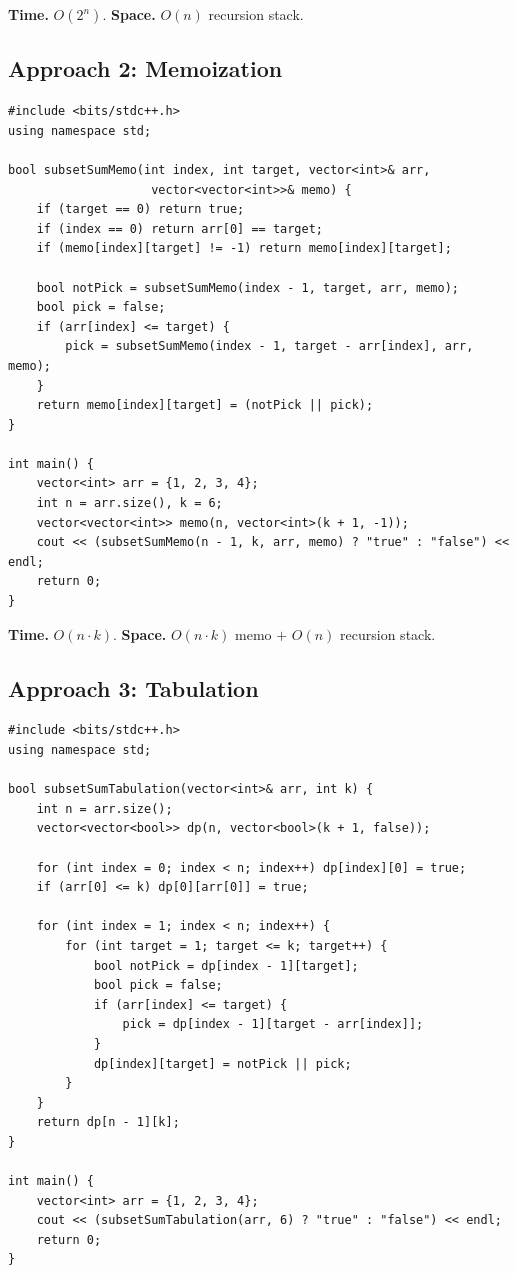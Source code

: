 \begin{complexitybox}
\textbf{Time.} $O(2^n)$.
\textbf{Space.} $O(n)$ recursion stack.
\end{complexitybox}

\subsection*{Approach 2: Memoization}

\begin{lstlisting}
#include <bits/stdc++.h>
using namespace std;

bool subsetSumMemo(int index, int target, vector<int>& arr,
                    vector<vector<int>>& memo) {
    if (target == 0) return true;
    if (index == 0) return arr[0] == target;
    if (memo[index][target] != -1) return memo[index][target];

    bool notPick = subsetSumMemo(index - 1, target, arr, memo);
    bool pick = false;
    if (arr[index] <= target) {
        pick = subsetSumMemo(index - 1, target - arr[index], arr, memo);
    }
    return memo[index][target] = (notPick || pick);
}

int main() {
    vector<int> arr = {1, 2, 3, 4};
    int n = arr.size(), k = 6;
    vector<vector<int>> memo(n, vector<int>(k + 1, -1));
    cout << (subsetSumMemo(n - 1, k, arr, memo) ? "true" : "false") << endl;
    return 0;
}
\end{lstlisting}

\begin{complexitybox}
\textbf{Time.} $O(n \cdot k)$.
\textbf{Space.} $O(n \cdot k)$ memo $+$ $O(n)$ recursion stack.
\end{complexitybox}

\subsection*{Approach 3: Tabulation}

\begin{lstlisting}
#include <bits/stdc++.h>
using namespace std;

bool subsetSumTabulation(vector<int>& arr, int k) {
    int n = arr.size();
    vector<vector<bool>> dp(n, vector<bool>(k + 1, false));

    for (int index = 0; index < n; index++) dp[index][0] = true;
    if (arr[0] <= k) dp[0][arr[0]] = true;

    for (int index = 1; index < n; index++) {
        for (int target = 1; target <= k; target++) {
            bool notPick = dp[index - 1][target];
            bool pick = false;
            if (arr[index] <= target) {
                pick = dp[index - 1][target - arr[index]];
            }
            dp[index][target] = notPick || pick;
        }
    }
    return dp[n - 1][k];
}

int main() {
    vector<int> arr = {1, 2, 3, 4};
    cout << (subsetSumTabulation(arr, 6) ? "true" : "false") << endl;
    return 0;
}
\end{lstlisting}

